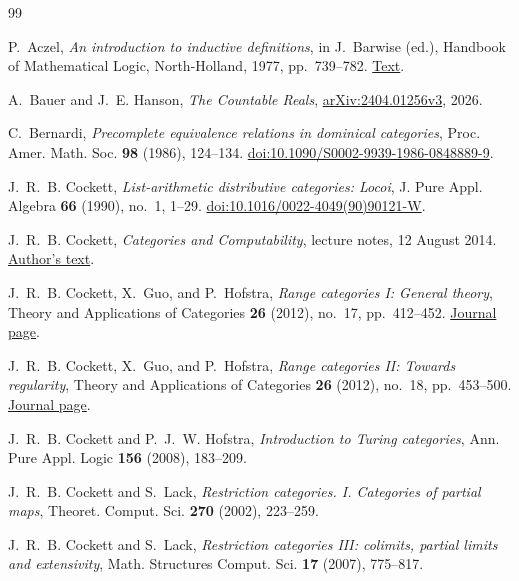 \begin{thebibliography}{99}
\small
{}
P.~Aczel, \emph{An introduction to inductive definitions},
in J.~Barwise (ed.), Handbook of Mathematical Logic,
North-Holland, 1977, pp.~739--782.
\href{https://lawrencecpaulson.github.io/papers/Aczel-Inductive-Defs.pdf}{Text}.

A.~Bauer and J.~E. Hanson, \emph{The Countable Reals},
\href{https://arxiv.org/abs/2404.01256v3}{arXiv:2404.01256v3}, 2026.

C.~Bernardi, \emph{Precomplete equivalence relations in dominical
categories}, Proc. Amer. Math. Soc. \textbf{98} (1986), 124--134.
\href{https://doi.org/10.1090/S0002-9939-1986-0848889-9}{doi:10.1090/S0002-9939-1986-0848889-9}.

J.~R.~B. Cockett, \emph{List-arithmetic distributive categories: Locoi},
J. Pure Appl. Algebra \textbf{66} (1990), no.~1, 1--29.
\href{https://doi.org/10.1016/0022-4049(90)90121-W}{doi:10.1016/0022-4049(90)90121-W}.

J.~R.~B. Cockett, \emph{Categories and Computability},
lecture notes, 12 August 2014.
\href{https://cspages.ucalgary.ca/~robin/talks/estonia-winter-2010/estonia-notes.pdf}{Author's text}.

J.~R.~B. Cockett, X.~Guo, and P.~Hofstra,
\emph{Range categories I: General theory},
Theory and Applications of Categories \textbf{26} (2012),
no.~17, pp.~412--452.
\href{https://www.tac.mta.ca/tac/volumes/26/17/26-17abs.html}{Journal page}.

J.~R.~B. Cockett, X.~Guo, and P.~Hofstra,
\emph{Range categories II: Towards regularity},
Theory and Applications of Categories \textbf{26} (2012),
no.~18, pp.~453--500.
\href{https://www.tac.mta.ca/tac/volumes/26/18/26-18abs.html}{Journal page}.

J.~R.~B. Cockett and P.~J.~W. Hofstra,
\emph{Introduction to Turing categories},
Ann. Pure Appl. Logic \textbf{156} (2008), 183--209.

J.~R.~B. Cockett and S.~Lack, \emph{Restriction categories. I.
Categories of partial maps}, Theoret. Comput. Sci. \textbf{270}
(2002), 223--259.

J.~R.~B. Cockett and S.~Lack,
\emph{Restriction categories III: colimits, partial limits and extensivity},
Math. Structures Comput. Sci. \textbf{17} (2007), 775--817.


\end{thebibliography}
